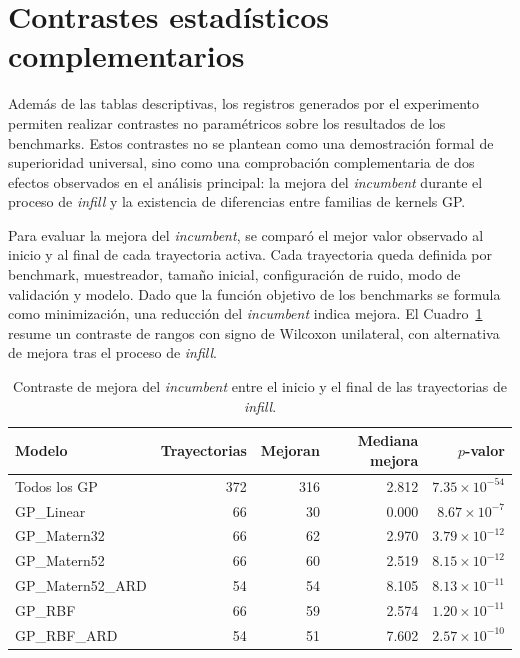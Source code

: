 \section{Contrastes estadísticos complementarios}
\label{app:contrastes_infill_benchmarks}

Además de las tablas descriptivas, los registros generados por el experimento permiten realizar contrastes no paramétricos sobre los resultados de los benchmarks. Estos contrastes no se plantean como una demostración formal de superioridad universal, sino como una comprobación complementaria de dos efectos observados en el análisis principal: la mejora del \emph{incumbent} durante el proceso de \emph{infill} y la existencia de diferencias entre familias de kernels GP.

Para evaluar la mejora del \emph{incumbent}, se comparó el mejor valor observado al inicio y al final de cada trayectoria activa. Cada trayectoria queda definida por benchmark, muestreador, tamaño inicial, configuración de ruido, modo de validación y modelo. Dado que la función objetivo de los benchmarks se formula como minimización, una reducción del \emph{incumbent} indica mejora. El Cuadro~\ref{tab:app_wilcoxon_infill_incumbent} resume un contraste de rangos con signo de Wilcoxon unilateral, con alternativa de mejora tras el proceso de \emph{infill}.

\begin{table}[htbp]
\centering
\small
\caption[Contraste de mejora del incumbent]{Contraste de mejora del \emph{incumbent} entre el inicio y el final de las trayectorias de \emph{infill}.}
\label{tab:app_wilcoxon_infill_incumbent}
\renewcommand{\arraystretch}{1.15}
\begin{tabularx}{\textwidth}{@{}X r r r r@{}}
\toprule
\textbf{Modelo} & \textbf{Trayectorias} & \textbf{Mejoran} & \textbf{Mediana mejora} & \textbf{\(p\)-valor} \\
\midrule
Todos los GP & 372 & 316 & 2.812 & \(7.35\times10^{-54}\) \\
GP\_Linear & 66 & 30 & 0.000 & \(8.67\times10^{-7}\) \\
GP\_Matern32 & 66 & 62 & 2.970 & \(3.79\times10^{-12}\) \\
GP\_Matern52 & 66 & 60 & 2.519 & \(8.15\times10^{-12}\) \\
GP\_Matern52\_ARD & 54 & 54 & 8.105 & \(8.13\times10^{-11}\) \\
GP\_RBF & 66 & 59 & 2.574 & \(1.20\times10^{-11}\) \\
GP\_RBF\_ARD & 54 & 51 & 7.602 & \(2.57\times10^{-10}\) \\
\bottomrule
\end{tabularx}
\end{table}
\FloatBarrier

